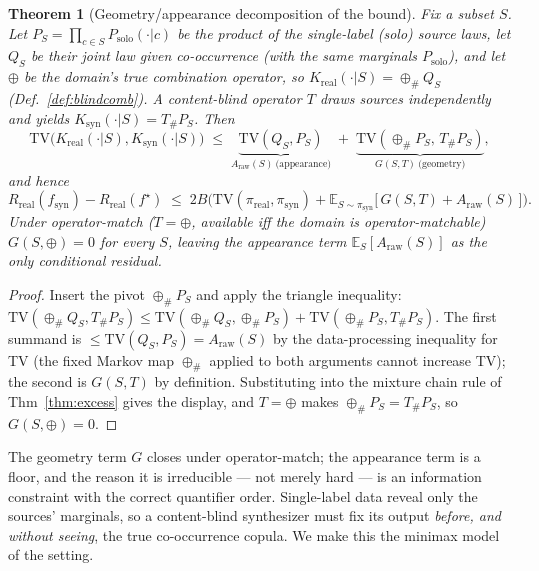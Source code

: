 \documentclass[11pt]{article}
\newtheorem{theorem}{Theorem}
\begin{document}
\begin{theorem}[Geometry/appearance decomposition of the bound]\label{thm:decomp}
Fix a subset $S$. Let $P_S=\prod_{c\in S}P_{\mathrm{solo}}(\cdot|c)$ be the product of the
single-label (solo) source laws, let $Q_S$ be their \emph{joint} law given co-occurrence
(with the same marginals $P_{\mathrm{solo}}$), and let $\oplus$ be the domain's true
combination operator, so $K_{\mathrm{real}}(\cdot|S)=\oplus_{\#}Q_S$ (Def.~\ref{def:blindcomb}).
A content-blind operator $T$ draws sources independently and yields
$K_{\mathrm{syn}}(\cdot|S)=T_{\#}P_S$. Then
\[
\mathrm{TV}\!\big(K_{\mathrm{real}}(\cdot|S),K_{\mathrm{syn}}(\cdot|S)\big)
\;\le\;
\underbrace{\mathrm{TV}(Q_S,P_S)}_{A_{\mathrm{raw}}(S)\ \text{(appearance)}}
\;+\;
\underbrace{\mathrm{TV}(\oplus_{\#}P_S,\,T_{\#}P_S)}_{G(S,T)\ \text{(geometry)}},
\]
and hence
\[
R_{\mathrm{real}}(f_{\mathrm{syn}})-R_{\mathrm{real}}(f^\star)
\;\le\; 2B\Big(\mathrm{TV}(\pi_{\mathrm{real}},\pi_{\mathrm{syn}})
+\mathbb{E}_{S\sim\pi_{\mathrm{syn}}}\big[\,G(S,T)+A_{\mathrm{raw}}(S)\,\big]\Big).
\]
Under \emph{operator-match} ($T=\oplus$, available iff the domain is operator-matchable)
$G(S,\oplus)=0$ for every $S$, leaving the appearance term $\mathbb{E}_S[A_{\mathrm{raw}}(S)]$
as the only conditional residual.
\end{theorem}
\begin{proof}
Insert the pivot $\oplus_{\#}P_S$ and apply the triangle inequality:
$\mathrm{TV}(\oplus_{\#}Q_S,T_{\#}P_S)\le
\mathrm{TV}(\oplus_{\#}Q_S,\oplus_{\#}P_S)+\mathrm{TV}(\oplus_{\#}P_S,T_{\#}P_S)$.
The first summand is $\le\mathrm{TV}(Q_S,P_S)=A_{\mathrm{raw}}(S)$ by the data-processing
inequality for TV (the fixed Markov map $\oplus_{\#}$ applied to both arguments cannot
increase TV); the second is $G(S,T)$ by definition. Substituting into the mixture chain rule
of Thm~\ref{thm:excess} gives the display, and $T=\oplus$ makes $\oplus_{\#}P_S=T_{\#}P_S$, so
$G(S,\oplus)=0$.
\end{proof}

The geometry term $G$ closes under operator-match; the appearance term is a floor, and the
reason it is irreducible --- not merely hard --- is an information constraint with the correct
quantifier order. Single-label data reveal only the sources' marginals, so a content-blind
synthesizer must fix its output \emph{before, and without seeing}, the true co-occurrence copula.
We make this the minimax model of the setting.
\end{document}
